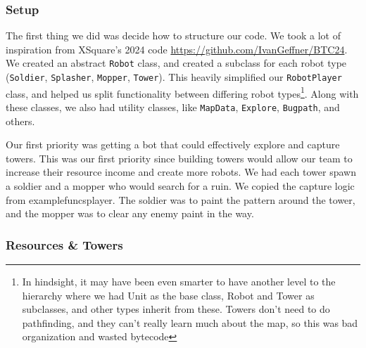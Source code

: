 \documentclass{article}
\begin{document}
  \subsubsection{Setup}

  The first thing we did was decide how to structure our code. We took a lot of inspiration from XSquare's 2024 code \url{https://github.com/IvanGeffner/BTC24}. We created an abstract \verb|Robot| class, and created a subclass for each robot type (\verb|Soldier|, \verb|Splasher|, \verb|Mopper|, \verb|Tower|). This heavily simplified our \verb|RobotPlayer| class, and helped us split functionality between differing robot types\footnote{In hindsight, it may have been even smarter to have another level to the hierarchy where we had Unit as the base class, Robot and Tower as subclasses, and other types inherit from these. Towers don't need to do pathfinding, and they can't really learn much about the map, so this was bad organization and wasted bytecode}. Along with these classes, we also had utility classes, like \verb|MapData|, \verb|Explore|, \verb|Bugpath|, and others.

  \medskip

  Our first priority was getting a bot that could effectively explore and capture towers. This was our first priority since building towers would allow our team to increase their resource income and create more robots. We had each tower spawn a soldier and a mopper who would search for a ruin. We copied the capture logic from examplefuncsplayer. The soldier was to paint the pattern around the tower, and the mopper was to clear any enemy paint in the way.

  \subsubsection{Resources \& Towers}
\end{document}
